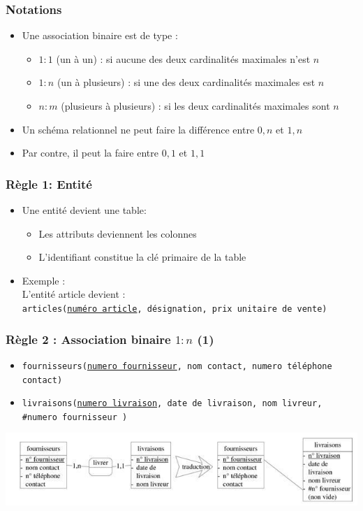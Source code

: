 \begin{frame}
  \frametitle{Notations}
  \begin{itemize}
    \item Une association binaire est de type :
      \begin{itemize}
        \item $1 : 1$ (un à un) : si aucune des deux cardinalités maximales n'est $n$
        \item $1 : n$ (un à plusieurs) : si une des deux cardinalités maximales est $n$
        \item $n : m$ (plusieurs à plusieurs) : si les deux cardinalités maximales sont $n$
      \end{itemize}
    \item Un schéma relationnel ne peut faire la différence entre $0,n$ et $1,n$
    \item Par contre, il peut la faire entre $0,1$ et $1,1$
  \end{itemize}
\end{frame}

\begin{frame}
  \frametitle{Règle 1: Entité}
  \begin{itemize}
    \item Une entité devient une table:
      \begin{itemize}
        \item Les attributs deviennent les colonnes
        \item L'identifiant constitue la clé primaire de la table
      \end{itemize}
    \item Exemple :\\ L'entité article devient :\\\texttt{articles(\underline{numéro article}, désignation, prix unitaire de
      vente)}
  \end{itemize}
\end{frame}

\begin{frame}
  \frametitle{Règle 2 : Association binaire $1:n$ (1)}
  \begin{itemize}
    \item \texttt{fournisseurs(\underline{numero fournisseur}, nom contact, numero téléphone contact)}
    \item \texttt{livraisons(\underline{numero livraison}, date de livraison, nom livreur, \#numero fournisseur )}
  \end{itemize}
  \begin{center}
    \includegraphics[width=0.9\linewidth]{traduction_1n.jpg}
  \end{center}
\end{frame}

